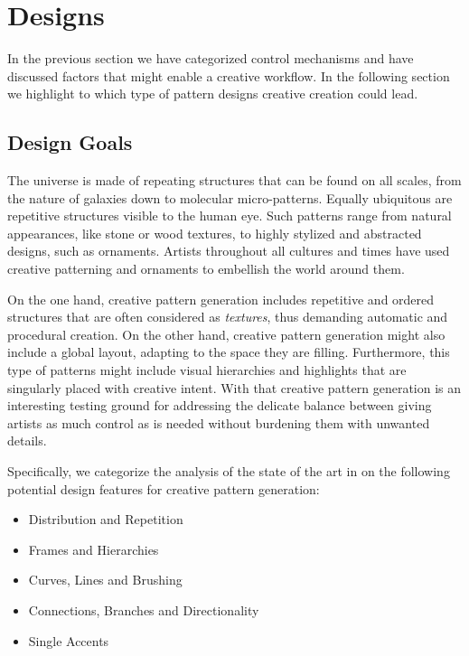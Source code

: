 
\section{Designs}
\label{sec:design}

In the previous section we have categorized control mechanisms and have discussed factors that might enable a creative workflow. In the following section we highlight to which type of pattern designs creative creation could lead.

\subsection{Design Goals}
\label{subsec:design_goals}

The universe is made of repeating structures that can be found on all scales, from the nature of galaxies down to molecular micro-patterns. Equally ubiquitous are repetitive structures visible to the human eye. Such patterns range from natural appearances, like stone or wood textures, to highly stylized and abstracted designs, such as ornaments. Artists throughout all cultures and times have used creative patterning and ornaments to embellish the world around them. 

On the one hand, creative pattern generation includes repetitive and ordered structures that are often considered as \textit{textures}, thus demanding automatic and procedural creation. On the other hand, creative pattern generation might also include a global layout, adapting to the space they are filling. Furthermore, this type of patterns might include visual hierarchies and highlights that are singularly placed with creative intent. With that creative pattern generation is an interesting testing ground for addressing the delicate balance between giving artists as much control as is needed without burdening them with unwanted details.

Specifically, we categorize the analysis of the state of the art in  on the following potential design features for creative pattern generation:


\begin{itemize}
    \item Distribution and Repetition
    \item Frames and Hierarchies
    \item Curves, Lines and Brushing
    \item Connections, Branches and Directionality
    \item Single Accents
\end{itemize}


